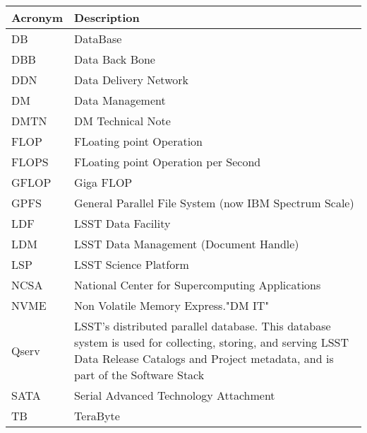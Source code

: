 \addtocounter{table}{-1}
\begin{longtable}{|p{}|p{}|}\hline
\textbf{Acronym} & \textbf{Description}  \\\hline

DB & DataBase \\\hline
DBB & Data Back Bone \\\hline
DDN & Data Delivery Network \\\hline
DM & Data Management \\\hline
DMTN & DM Technical Note \\\hline
FLOP & FLoating point Operation \\\hline
FLOPS & FLoating point Operation per Second \\\hline
GFLOP & Giga FLOP \\\hline
GPFS & General Parallel File System (now IBM Spectrum Scale) \\\hline
LDF & LSST Data Facility \\\hline
LDM & LSST Data Management (Document Handle) \\\hline
LSP & LSST Science Platform \\\hline
NCSA & National Center for Supercomputing Applications \\\hline
NVME & Non Volatile Memory Express."DM IT" \\\hline
Qserv & LSST's distributed parallel database. This database system is used for collecting, storing, and serving LSST Data Release Catalogs and Project metadata, and is part of the Software Stack \\\hline
SATA & Serial Advanced Technology Attachment \\\hline
TB & TeraByte \\\hline
\end{longtable}
